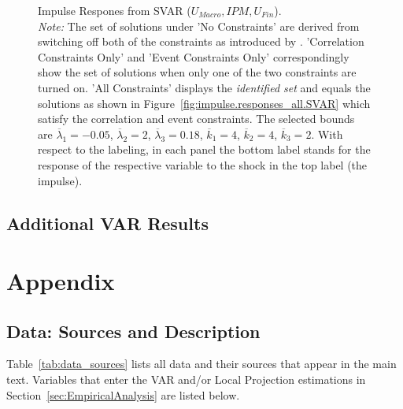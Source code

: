 \documentclass[a4paper,11pt,listof=nochaptergap,oneside,pointednumbers,bibtotoc,bigheadings,liststotoc]{scrbook}
\theoremstyle{mysatz}
\theoremstyle{mydefinition}
\theoremstyle{mytheorem}
\theoremstyle{mybemerkung}
\begin{document}
\begin{figure}[!h]
   \centering
   \setlength\fboxsep{0pt}
   \setlength\fboxrule{0pt}
      \caption[Impulse Respones from SVAR ($U_{Macro}, IPM, U_{Fin}$).]{Impulse Respones from SVAR ($U_{Macro}, IPM, U_{Fin}$).\\
      \textit{Note:} The set of solutions under 'No Constraints' are derived from switching off both of the constraints as introduced by \citet{ludvigsonetal:18}. 'Correlation Constraints Only' and 'Event Constraints Only' correspondingly show the set of solutions when only one of the two constraints are turned on. 'All Constraints' displays the \textit{identified set} and equals the solutions as shown in Figure~\ref{fig:impulse.responses_all.SVAR} which satisfy the correlation and event constraints. The selected bounds are $\overline{\lambda}_1 = -0.05$, $\overline{\lambda}_2 = 2$, $\overline{\lambda}_3 = 0.18$, $\overline{k}_1 = 4$, $\overline{k}_2 = 4$, $\overline{k}_3 = 2$. With respect to the labeling, in each panel the bottom label stands for the response of the respective variable to the shock in the top label (the impulse).}   \label{fig:impulse.responses_all.SVAR_UNCONSTR}
\end{figure}

\section{Additional VAR Results}




\chapter{Appendix}
\label{DataAndCode}
\section{Data: Sources and Description}
\label{sec:dataAppendix}
Table~\ref{tab:data_sources} lists all data and their sources that appear in the main text. Variables that enter the VAR and/or Local Projection estimations in Section~\ref{sec:EmpiricalAnalysis} are listed below.
\end{document}

